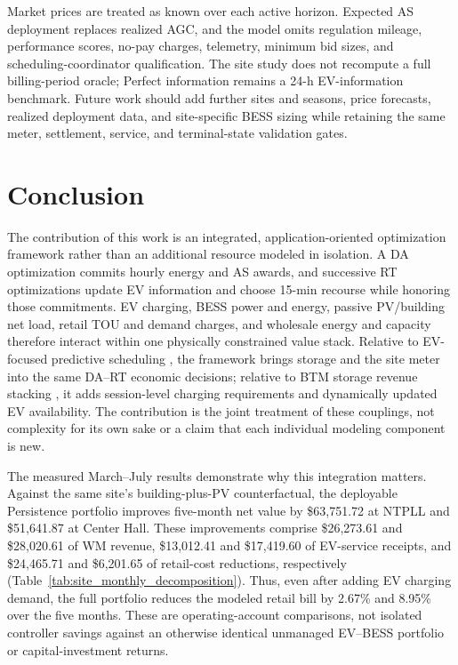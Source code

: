 \documentclass[final,5p,times]{elsarticle}
\begin{document}
Market prices are treated as known over each active horizon. Expected AS
deployment replaces realized AGC, and the model omits regulation mileage,
performance scores, no-pay charges, telemetry, minimum bid sizes, and
scheduling-coordinator qualification. The site study does not recompute a full
billing-period oracle; Perfect information remains a 24-h EV-information
benchmark. Future work should add further sites and seasons, price forecasts,
realized deployment data, and site-specific BESS sizing while retaining the
same meter, settlement, service, and terminal-state validation gates.

\section{Conclusion}
\label{sec:conclusion}

The contribution of this work is an integrated, application-oriented
optimization framework rather than an additional resource modeled in isolation.
A DA optimization commits hourly energy and AS awards, and successive RT
optimizations update EV information and choose 15-min recourse while honoring
those commitments. EV charging, BESS power and energy, passive PV/building
net load, retail TOU and demand charges, and wholesale energy and capacity
therefore interact within one physically constrained value stack. Relative to
EV-focused predictive scheduling \cite{chen2026realtime}, the framework brings
storage and the site meter into the same DA--RT economic decisions; relative
to BTM storage revenue stacking \cite{seward2022revenueStacking}, it adds
session-level charging requirements and dynamically updated EV availability.
The contribution is the joint treatment of these couplings, not complexity
for its own sake or a claim that each individual modeling component is new.

The measured March--July results demonstrate why this integration matters.
Against the same site's building-plus-PV counterfactual, the deployable
Persistence portfolio improves five-month net value by \$63,751.72 at NTPLL
and \$51,641.87 at Center Hall. These improvements comprise \$26,273.61
and \$28,020.61 of WM revenue, \$13,012.41 and \$17,419.60 of EV-service
receipts, and \$24,465.71 and \$6,201.65 of retail-cost reductions,
respectively (Table~\ref{tab:site_monthly_decomposition}). Thus, even after
adding EV charging demand, the full portfolio reduces the modeled retail bill
by 2.67\% and 8.95\% over the five months. These are operating-account
comparisons, not isolated controller savings against an otherwise identical
unmanaged EV--BESS portfolio or capital-investment returns.
\end{document}
